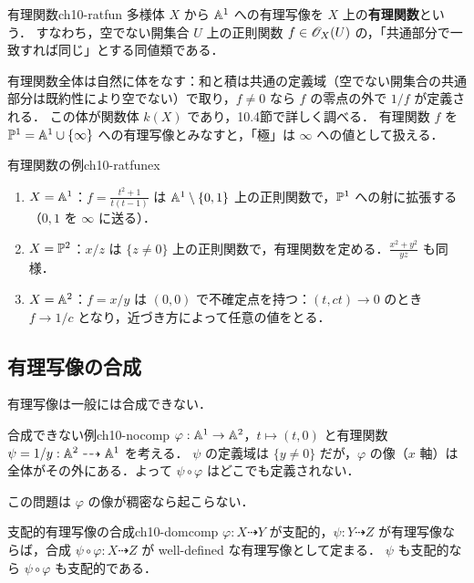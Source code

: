 \begin{mydef}{有理関数}{ch10-ratfun}
多様体 $X$ から $\mathbb{A}^1$ への有理写像を $X$ 上の\textbf{有理関数}という．
すなわち，空でない開集合 $U$ 上の正則関数 $f\in\mathscr{O}_X(U)$ の，「共通部分で一致すれば同じ」とする同値類である．
\end{mydef}

有理関数全体は自然に体をなす：和と積は共通の定義域（空でない開集合の共通部分は既約性により空でない）で取り，$f\neq0$ なら $f$ の零点の外で $1/f$ が定義される．
この体が関数体 $k(X)$ であり，10.4節で詳しく調べる．
有理関数 $f$ を $\mathbb{P}^1=\mathbb{A}^1\cup\{\infty\}$ への有理写像とみなすと，「極」は $\infty$ への値として扱える．

\begin{myex}{有理関数の例}{ch10-ratfunex}
\begin{enumerate}
  \item $X=\mathbb{A}^1$：$f=\frac{t^2+1}{t(t-1)}$ は $\mathbb{A}^1\setminus\{0,1\}$ 上の正則関数で，$\mathbb{P}^1$ への射に拡張する（$0,1$ を $\infty$ に送る）．
  \item $X=\mathbb{P}^2$：$x/z$ は $\{z\neq0\}$ 上の正則関数で，有理関数を定める．$\frac{x^2+y^2}{yz}$ も同様．
  \item $X=\mathbb{A}^2$：$f=x/y$ は $(0,0)$ で不確定点を持つ：$(t,ct)\to0$ のとき $f\to1/c$ となり，近づき方によって任意の値をとる．
\end{enumerate}
\end{myex}

\subsection{有理写像の合成}

有理写像は一般には合成できない．

\begin{myex}{合成できない例}{ch10-nocomp}
$\varphi:\mathbb{A}^1\to\mathbb{A}^2$，$t\mapsto(t,0)$ と有理関数 $\psi=1/y:\mathbb{A}^2\dashrightarrow\mathbb{A}^1$ を考える．
$\psi$ の定義域は $\{y\neq0\}$ だが，$\varphi$ の像（$x$ 軸）は全体がその外にある．よって $\psi\circ\varphi$ はどこでも定義されない．
\end{myex}

この問題は $\varphi$ の像が稠密なら起こらない．

\begin{myprop}{支配的有理写像の合成}{ch10-domcomp}
$\varphi:X\dashrightarrow Y$ が支配的，$\psi:Y\dashrightarrow Z$ が有理写像ならば，合成 $\psi\circ\varphi:X\dashrightarrow Z$ が well-defined な有理写像として定まる．
$\psi$ も支配的なら $\psi\circ\varphi$ も支配的である．
\end{myprop}

